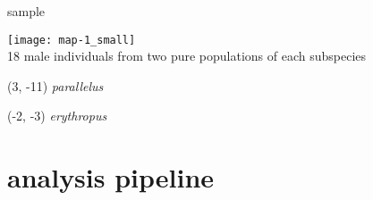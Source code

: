 \documentclass[xcolor=pdftex,dvipsnames,table, handout]{beamer}
\begin{document}
%
\begin{frame}{sample}
\begin{center}
\scriptsize
\texttt{[image: map-1\_small]}\\ \vskip5pt
18 male individuals from two pure populations of each subspecies
\begin{textblock}{10}(3, -11) \textit{parallelus}\end{textblock}
\begin{textblock}{10}(-2, -3) \textit{erythropus}\end{textblock}
\end{center}
\end{frame}
%

\section{analysis pipeline}
\end{document}
